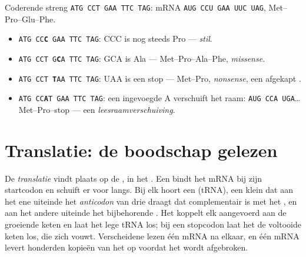 \begin{example}\label{ex:g11:gene-expression:outcomes}
Coderende streng \texttt{ATG CCT GAA TTC TAG}: mRNA
\texttt{AUG CCU GAA UUC UAG},  Met--Pro--Glu--Phe.
\begin{itemize}
  \item \texttt{ATG CC\textbf{C} GAA TTC TAG}: CCC is nog steeds Pro ---
        \emph{stil}.
  \item \texttt{ATG CCT G\textbf{C}A TTC TAG}: GCA is Ala ---
        Met--Pro--Ala--Phe, \emph{missense}.
  \item \texttt{ATG CCT \textbf{T}AA TTC TAG}: UAA is een stop ---
        Met--Pro, \emph{nonsense}, een afgekapt .
  \item \texttt{ATG CC\textbf{A}T GAA TTC TAG}: een ingevoegde A
        verschuift het raam: \texttt{AUG CCA UGA}\dots{} Met--Pro--stop
        --- een \emph{leesraamverschuiving}.
\end{itemize}
\end{example}

\section{Translatie: de boodschap gelezen}

\begin{proposition}[Translatie]\label{prop:g11:gene-expression:translation}
De \emph{translatie} vindt plaats op de
\emph{}, in het . Een  bindt het mRNA bij zijn
startcodon en schuift er  voor  langs. Bij elk  hoort een
\emph{} (tRNA), een klein  dat aan het ene uiteinde het
\emph{anticodon} van drie  draagt dat complementair is met het
, en aan het andere uiteinde het bijbehorende . Het
 koppelt elk aangevoerd  aan de groeiende keten en laat
het lege tRNA los; bij een stopcodon laat het de voltooide keten los, die
zich vouwt. Verscheidene  lezen één mRNA na elkaar, en één mRNA
levert honderden kopieën van het  op voordat het wordt afgebroken.
\end{proposition}
\admitted


